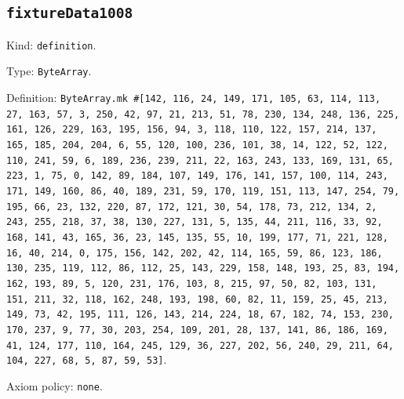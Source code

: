 \documentclass[11pt]{article}
\begin{document}
\subsection*{\texttt{fixtureData1008}}
\noindent Kind: \texttt{definition}.\par
\noindent Type: \texttt{ByteArray}.\par
\noindent Definition: \texttt{ByteArray.mk \#[142, 116, 24, 149, 171, 105, 63, 114, 113, 27, 163, 57, 3, 250, 42, 97, 21, 213, 51, 78, 230, 134, 248, 136, 225, 161, 126, 229, 163, 195, 156, 94, 3, 118, 110, 122, 157, 214, 137, 165, 185, 204, 204, 6, 55, 120, 100, 236, 101, 38, 14, 122, 52, 122, 110, 241, 59, 6, 189, 236, 239, 211, 22, 163, 243, 133, 169, 131, 65, 223, 1, 75, 0, 142, 89, 184, 107, 149, 176, 141, 157, 100, 114, 243, 171, 149, 160, 86, 40, 189, 231, 59, 170, 119, 151, 113, 147, 254, 79, 195, 66, 23, 132, 220, 87, 172, 121, 30, 54, 178, 73, 212, 134, 2, 243, 255, 218, 37, 38, 130, 227, 131, 5, 135, 44, 211, 116, 33, 92, 168, 141, 43, 165, 36, 23, 145, 135, 55, 10, 199, 177, 71, 221, 128, 16, 40, 214, 0, 175, 156, 142, 202, 42, 114, 165, 59, 86, 123, 186, 130, 235, 119, 112, 86, 112, 25, 143, 229, 158, 148, 193, 25, 83, 194, 162, 193, 89, 5, 120, 231, 176, 103, 8, 215, 97, 50, 82, 103, 131, 151, 211, 32, 118, 162, 248, 193, 198, 60, 82, 11, 159, 25, 45, 213, 149, 73, 42, 195, 111, 126, 143, 214, 224, 18, 67, 182, 74, 153, 230, 170, 237, 9, 77, 30, 203, 254, 109, 201, 28, 137, 141, 86, 186, 169, 41, 124, 177, 110, 164, 245, 129, 36, 227, 202, 56, 240, 29, 211, 64, 104, 227, 68, 5, 87, 59, 53]}.\par
\noindent Axiom policy: \texttt{none}.\par
\end{document}
